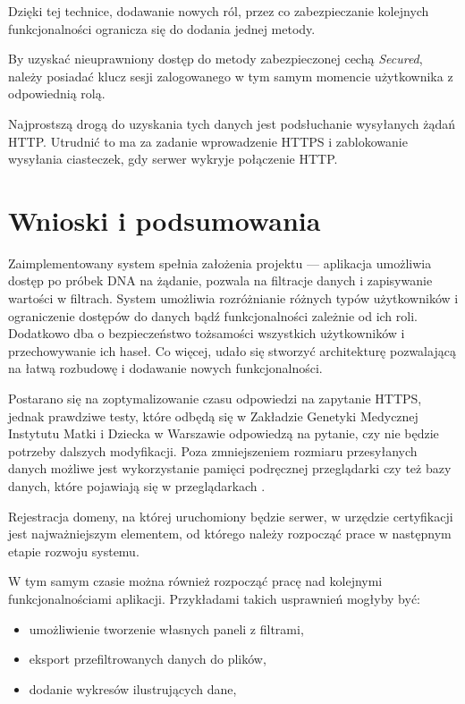 \documentclass[a4paper,12pt,twoside]{article}
\begin{document}
Dzięki tej technice, dodawanie nowych ról, przez co zabezpieczanie
kolejnych funkcjonalności ogranicza się do dodania jednej metody.

By uzyskać nieuprawniony dostęp do metody zabezpieczonej cechą \textit{Secured},
należy posiadać klucz sesji zalogowanego w tym samym momencie użytkownika
z odpowiednią rolą.

Najprostszą drogą do uzyskania tych danych jest podsłuchanie wysyłanych
żądań HTTP. Utrudnić to ma za zadanie wprowadzenie HTTPS i zablokowanie wysyłania
ciasteczek, gdy serwer wykryje połączenie HTTP.

\newpage
\section{Wnioski i podsumowania}

Zaimplementowany system spełnia założenia projektu — aplikacja
umożliwia dostęp po próbek DNA na żądanie, pozwala na filtracje danych
i zapisywanie wartości w filtrach.
System umożliwia rozróżnianie różnych typów użytkowników
i ograniczenie dostępów do danych bądź funkcjonalności zależnie od ich
roli.
Dodatkowo dba o bezpieczeństwo
tożsamości wszystkich użytkowników i przechowywanie ich haseł.
Co więcej, udało się stworzyć
architekturę pozwalającą na łatwą rozbudowę
i dodawanie nowych funkcjonalności.

Postarano się na zoptymalizowanie czasu odpowiedzi na zapytanie HTTPS,
jednak prawdziwe testy, które odbędą się w Zakładzie Genetyki Medycznej Instytutu Matki i Dziecka w Warszawie odpowiedzą na pytanie, czy
nie będzie potrzeby dalszych modyfikacji. Poza zmniejszeniem
rozmiaru przesyłanych danych możliwe jest wykorzystanie pamięci podręcznej
przeglądarki czy też bazy danych, które pojawiają się w przeglądarkach \cite{w3cDatabase}.

Rejestracja domeny, na której uruchomiony będzie serwer,
w urzędzie certyfikacji jest najważniejszym elementem,
od którego należy rozpocząć prace w następnym etapie rozwoju systemu.

W tym samym czasie można również rozpocząć pracę nad kolejnymi funkcjonalnościami
aplikacji. Przykładami takich usprawnień mogłyby być:
\begin{itemize}
\item umożliwienie tworzenie własnych paneli z filtrami,
\item eksport przefiltrowanych danych do plików,
\item dodanie wykresów ilustrujących dane,
\end{itemize}
\end{document}
